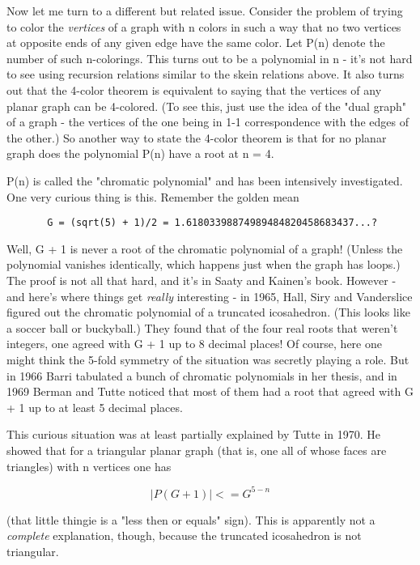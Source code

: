 Now let me turn to a different but related issue.  Consider the problem
of trying to color the \emph{vertices} of a graph with n colors in such a way
that no two vertices at opposite ends of any given edge have the same
color.  Let P(n) denote the number of such n-colorings.  This turns out
to be a polynomial in n - it's not hard to see using recursion relations
similar to the skein relations above.  It also turns out that the
4-color theorem is equivalent to saying that the vertices of any planar
graph can be 4-colored.  (To see this, just use the idea of the "dual
graph" of a graph - the vertices of the one being in 1-1 correspondence with
the edges of the other.)  So another way to state the 4-color theorem is
that for no planar graph does the polynomial P(n) have a root at n = 4.

P(n) is called the "chromatic polynomial" and has been intensively
investigated.  One very curious thing is this.  Remember the golden mean

\begin{verbatim}
       G = (sqrt(5) + 1)/2 = 1.61803398874989484820458683437...?
\end{verbatim}
    

Well, G + 1 is never a root of the chromatic polynomial of a graph!
(Unless the polynomial vanishes identically, which happens just when the
graph has loops.)  The proof is not all that hard, and it's in Saaty and
Kainen's book.   However - and here's where things get \emph{really}
interesting - in 1965, Hall, Siry and Vanderslice figured out the
chromatic polynomial of a truncated icosahedron.  (This looks like a
soccer ball or buckyball.) They found that of the four real roots that
weren't integers, one agreed with G + 1 up to 8 decimal places!  Of
course, here one might think the 5-fold symmetry of the situation was
secretly playing a role.  But in 1966 Barri tabulated a bunch of
chromatic polynomials in her thesis, and in 1969 Berman and Tutte
noticed that most of them had a root that agreed with G + 1 up to at
least 5 decimal places.  

This curious situation was at least partially explained by Tutte in
1970.  He showed that for a triangular planar graph (that is, one all
of whose faces are triangles) with n vertices one has

$$
                     |P(G + 1)| <= G^{5-n} 
$$
    

(that little thingie is a "less then or equals" sign).  This is
apparently not a \emph{complete} explanation, though, because the truncated
icosahedron is not triangular.  

